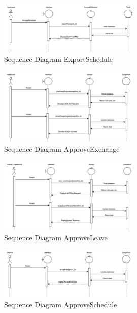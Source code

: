     \begin{figure}[h]
    \centering
    \includegraphics[width=0.6\textwidth]{Sequence 3.4.png}
    \caption{Sequence Diagram ExportSchedule}
    \end{figure}



    \begin{figure}[h]
    \centering
    \includegraphics[width=0.6\textwidth]{Sequence 4.1.png}
    \caption{Sequence Diagram ApproveExchange}
    \end{figure}

    \begin{figure}[h]
    \centering
    \includegraphics[width=0.6\textwidth]{Sequence 4.2.png}
    \caption{Sequence Diagram ApproveLeave}
    \end{figure}

    \begin{figure}[h]
    \centering
    \includegraphics[width=0.6\textwidth]{Sequence 4.3.png}
    \caption{Sequence Diagram ApproveSchedule}
    \end{figure}



